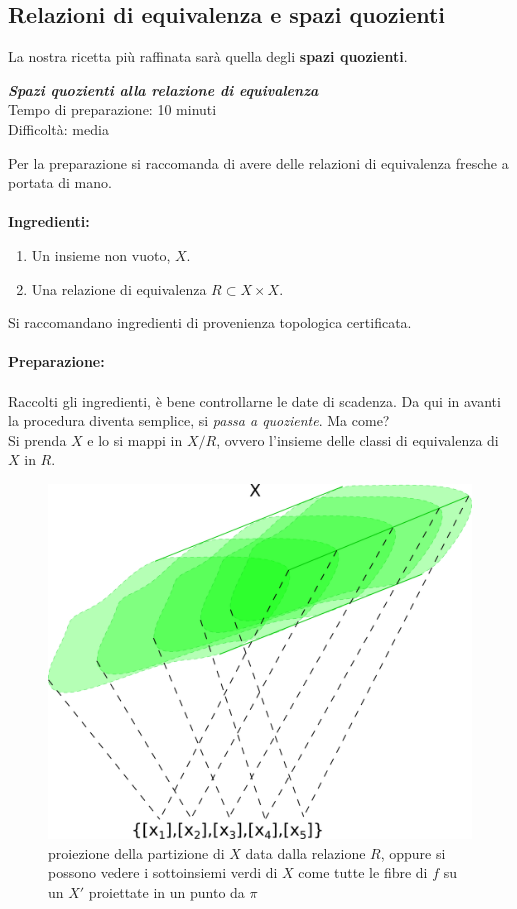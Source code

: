 \subsection{\textcolor{TopGener}{\textbf{Relazioni di equivalenza e spazi quozienti}}}
La nostra ricetta più raffinata sarà quella degli \textbf{spazi quozienti}. 

\begin{flushright}
	{\selectfont
		\textit{\textcolor{TopGener}{\textbf{Spazi quozienti alla relazione di equivalenza}}}\\
		Tempo di preparazione: 10 minuti\\
		Difficoltà: media
	}
\end{flushright}

Per la preparazione si raccomanda di avere delle relazioni di equivalenza fresche a portata di mano. \\ \\
{\Large \textbf{Ingredienti:}} \\
\begin{enumerate}
	\item Un insieme non vuoto, $X$.
	\item Una relazione di equivalenza $R \subset X \times X$.
\end{enumerate}
Si raccomandano ingredienti di provenienza topologica certificata.
\\ \\ {\Large \textbf{Preparazione:}} \\ \\
Raccolti gli ingredienti, è bene controllarne le date di scadenza. Da qui in avanti la procedura diventa semplice, si \textit{passa a quoziente}. Ma come? \\ Si prenda $X$ e lo si mappi in $X / R$, ovvero l'insieme delle classi di equivalenza di $X$ in $R$. 

\begin{figure}[h]
	\centering
	\includegraphics[width=0.5\linewidth]{images/topologia_generale/projection_quotient}
	\caption{proiezione della partizione di $X$ data dalla relazione $R$, oppure si possono vedere i sottoinsiemi verdi di $X$ come tutte le fibre di $f$ su un $X'$ proiettate in un punto da $\pi$}
	\label{fig:projectionquotient}
\end{figure}

